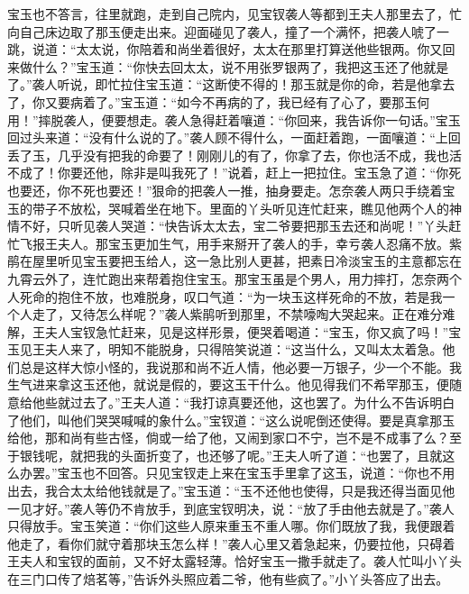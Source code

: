 \begin{parag}
    宝玉也不答言，往里就跑，走到自己院内，见宝钗袭人等都到王夫人那里去了，忙向自己床边取了那玉便走出来。迎面碰见了袭人，撞了一个满怀，把袭人唬了一跳，说道：“太太说，你陪着和尚坐着很好，太太在那里打算送他些银两。你又回来做什么？”宝玉道：“你快去回太太，说不用张罗银两了，我把这玉还了他就是了。”袭人听说，即忙拉住宝玉道：“这断使不得的！那玉就是你的命，若是他拿去了，你又要病着了。”宝玉道：“如今不再病的了，我已经有了心了，要那玉何用！”摔脱袭人，便要想走。袭人急得赶着嚷道：“你回来，我告诉你一句话。”宝玉回过头来道：“没有什么说的了。”袭人顾不得什么，一面赶着跑，一面嚷道：“上回丢了玉，几乎没有把我的命要了！刚刚儿的有了，你拿了去，你也活不成，我也活不成了！你要还他，除非是叫我死了！”说着，赶上一把拉住。宝玉急了道：“你死也要还，你不死也要还！”狠命的把袭人一推，抽身要走。怎奈袭人两只手绕着宝玉的带子不放松，哭喊着坐在地下。里面的丫头听见连忙赶来，瞧见他两个人的神情不好，只听见袭人哭道：“快告诉太太去，宝二爷要把那玉去还和尚呢！”丫头赶忙飞报王夫人。那宝玉更加生气，用手来掰开了袭人的手，幸亏袭人忍痛不放。紫鹃在屋里听见宝玉要把玉给人，这一急比别人更甚，把素日冷淡宝玉的主意都忘在九霄云外了，连忙跑出来帮着抱住宝玉。那宝玉虽是个男人，用力摔打，怎奈两个人死命的抱住不放，也难脱身，叹口气道：“为一块玉这样死命的不放，若是我一个人走了，又待怎么样呢？”袭人紫鹃听到那里，不禁嚎啕大哭起来。正在难分难解，王夫人宝钗急忙赶来，见是这样形景，便哭着喝道：“宝玉，你又疯了吗！”宝玉见王夫人来了，明知不能脱身，只得陪笑说道：“这当什么，又叫太太着急。他们总是这样大惊小怪的，我说那和尚不近人情，他必要一万银子，少一个不能。我生气进来拿这玉还他，就说是假的，要这玉干什么。他见得我们不希罕那玉，便随意给他些就过去了。”王夫人道：“我打谅真要还他，这也罢了。为什么不告诉明白了他们，叫他们哭哭喊喊的象什么。”宝钗道：“这么说呢倒还使得。要是真拿那玉给他，那和尚有些古怪，倘或一给了他，又闹到家口不宁，岂不是不成事了么？至于银钱呢，就把我的头面折变了，也还够了呢。”王夫人听了道：“也罢了，且就这么办罢。”宝玉也不回答。只见宝钗走上来在宝玉手里拿了这玉，说道：“你也不用出去，我合太太给他钱就是了。”宝玉道：“玉不还他也使得，只是我还得当面见他一见才好。”袭人等仍不肯放手，到底宝钗明决，说：“放了手由他去就是了。”袭人只得放手。宝玉笑道：“你们这些人原来重玉不重人哪。你们既放了我，我便跟着他走了，看你们就守着那块玉怎么样！”袭人心里又着急起来，仍要拉他，只碍着王夫人和宝钗的面前，又不好太露轻薄。恰好宝玉一撒手就走了。袭人忙叫小丫头在三门口传了焙茗等，”告诉外头照应着二爷，他有些疯了。”小丫头答应了出去。
\end{parag}


